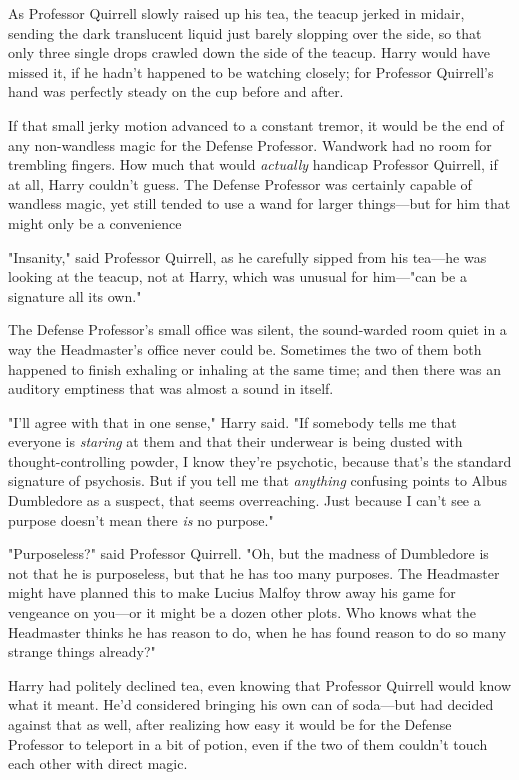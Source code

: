 As Professor Quirrell slowly raised up his tea, the teacup jerked in midair,
sending the dark translucent liquid just barely slopping over the side, so that
only three single drops crawled down the side of the teacup. Harry would have
missed it, if he hadn't happened to be watching closely; for Professor
Quirrell's hand was perfectly steady on the cup before and after.

If that small jerky motion advanced to a constant tremor, it would be the end
of any non-wandless magic for the Defense Professor. Wandwork had no room for
trembling fingers. How much that would \emph{actually} handicap Professor
Quirrell, if at all, Harry couldn't guess. The Defense Professor was certainly
capable of wandless magic, yet still tended to use a wand for larger
things---but for him that might only be a convenience{\el}

"Insanity," said Professor Quirrell, as he carefully sipped from his tea---he
was looking at the teacup, not at Harry, which was unusual for him\mbox{---}"can be a
signature all its own."

The Defense Professor's small office was silent, the sound-warded room quiet in
a way the Headmaster's office never could be. Sometimes the two of them both
happened to finish exhaling or inhaling at the same time; and then there was an
auditory emptiness that was almost a sound in itself.

"I'll agree with that in one sense," Harry said. "If somebody tells me that
everyone is \emph{staring} at them and that their underwear is being dusted
with thought-controlling powder, I know they're psychotic, because that's the
standard signature of psychosis. But if you tell me that \emph{anything}
confusing points to Albus Dumbledore as a suspect, that seems{\el}
overreaching. Just because I can't see a purpose doesn't mean there \emph{is}
no purpose."

"Purposeless?" said Professor Quirrell. "Oh, but the madness of Dumbledore is
not that he is purposeless, but that he has too many purposes. The Headmaster
might have planned this to make Lucius Malfoy throw away his game for vengeance
on you---or it might be a dozen other plots. Who knows what the Headmaster
thinks he has reason to do, when he has found reason to do so many strange
things already?"

Harry had politely declined tea, even knowing that Professor Quirrell would
know what it meant. He'd considered bringing his own can of soda---but had
decided against that as well, after realizing how easy it would be for the
Defense Professor to teleport in a bit of potion, even if the two of them
couldn't touch each other with direct magic.

